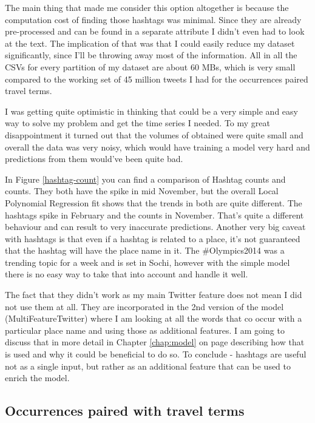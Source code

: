 \documentclass[minf,twoside,singlespacing,parskip,frontabs,notimes,11pt]{infthesis}
\begin{document}
The main thing that made me consider this option altogether is because the computation cost of finding those hashtags was minimal. Since they are already pre-processed and can be found in a separate attribute I didn't even had to look at the text. The implication of that was that I could easily reduce my dataset significantly, since I'll be throwing away most of the information. All in all the CSVs for every partition of my dataset are about 60 MBs, which is very small compared to the working set of 45 million tweets I had for the occurrences paired travel terms. 


I was getting quite optimistic  in thinking that could be a very simple and easy way to solve my problem and get the time series I needed. To my great disappointment it turned out that the volumes of obtained were quite small and overall the data was very noisy, which would have training a model very hard and predictions from them would've been quite bad. 


In Figure \ref{hashtag-count} you can find a comparison of Hashtag counts and counts. They both have the spike in mid November, but the overall Local Polynomial Regression fit shows that the trends in both are quite different. The hashtags spike in February and the counts in November. That's quite a different behaviour and can result to very inaccurate predictions. Another very big caveat with hashtags is that even if a hashtag is related to a place, it's not guaranteed that the hashtag will have the place name in it. The \#Olympics2014 was a trending topic for a week and is set in Sochi, however with the simple model there is no easy way to take that into account and handle it well.


The fact that they didn't work as my main Twitter feature does not mean I did not use them at all. They are incorporated in the 2nd version of the model (MultiFeatureTwitter) where I am looking at all the words that co occur with a particular place name and using those as additional features. I am going to discuss that in more detail in Chapter \ref{chap:model} on page \pageref{chap:model} describing how that is used and why it could be beneficial to do so. To conclude - hashtags are useful not as a single input, but rather as an additional feature that can be used to enrich the model.



\subsection{Occurrences paired with travel terms} 
\label{sec:tweettext}
\end{document}
